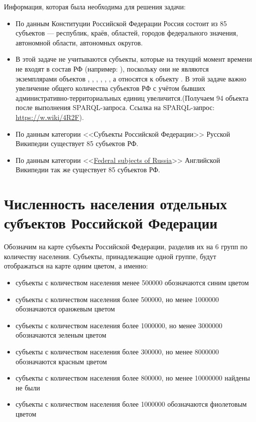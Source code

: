 Информация, которая была необходима для решения задачи:
\begin{itemize}
  \item По данным Конституции Российской Федерации Россия состоит из 85 субъектов — республик, краёв, областей, городов федерального значения, автономной области, автономных округов.
  \item В этой задаче не учитываются субъекты, которые на текущий момент времени не входят в состав РФ (например: ), поскольку они не являются экземплярами объектов , , , , , , а относятся к объекту . В этой задаче важно увеличение общего количества субъектов РФ с учётом бывших административно-территориальных единиц увеличится.(Получаем 94 объекта после выполнения SPARQL-запроса. Ссылка на SPARQL-запрос: \href{https://w.wiki/4R2F}{https://w.wiki/4R2F}). 
  \item По данным категории <<Субъекты Российской Федерации>> Русской Википедии существует 85 субъектов РФ.
  \item По данным категории <<\href{https://ru.wikipedia.org/wiki/en:Federal_subjects_of_Russia}{Federal subjects of Russia}>> Английской Википедии так же существует 85 субъектов РФ.
\end{itemize}

\section{Численность населения отдельных субъектов Российской Федерации}

Обозначим на карте субъекты Российской Федерации, разделив их на 6 групп по количеству населения. Субъекты, принадлежащие одной группе, будут отображаться на карте одним цветом, а именно:
\begin{itemize}
  \item субъекты с количеством населения менее \num{500000} обозначаются синим цветом
  \item субъекты с количеством населения более \num{500000}, но менее \num{1000000} обозначаются оранжевым цветом
  \item субъекты с количеством населения более \num{1000000}, но менее \num{3000000} обозначаются зеленым цветом
  \item субъекты с количеством населения более \num{300000}, но менее \num{8000000} обозначаются красным цветом
  \item субъекты с количеством населения более \num{800000}, но менее \num{10000000} найдены не были
  \item субъекты с количеством населения более \num{1000000} обозначаются фиолетовым цветом
\end{itemize}

